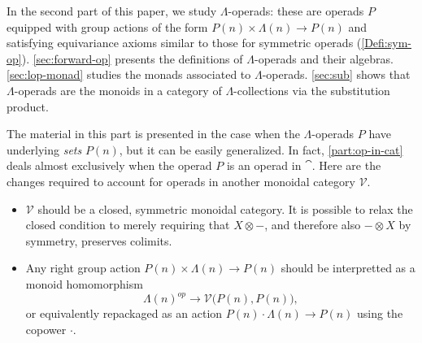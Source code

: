 \label{part:op-with-eq}

In the second part of this paper, we study $\Lambda$-operads: these are operads $P$ equipped with group actions of the form $P(n) \times \Lambda(n) \to P(n)$ and satisfying equivariance axioms similar to those for symmetric operads (\cref{Defi:sym-op}). \cref{sec:forward-op} presents the definitions of $\Lambda$-operads and their algebras.\cref{sec:lop-monad} studies the monads associated to $\Lambda$-operads. \cref{sec:sub} shows that $\Lambda$-operads are the monoids in a category of $\Lambda$-collections via the substitution product.

\begin{rem}\label{rem:lop-Venriched}
The material in this part is presented in the case when the $\Lambda$-operads $P$ have underlying \emph{sets} $P(n)$, but it can be easily generalized. In fact, \cref{part:op-in-cat} deals almost exclusively when the operad $P$ is an operad in $\cat$. Here are the changes required to account for operads in another monoidal category $\mathcal{V}$.
\begin{itemize}
\item $\mathcal{V}$ should be a closed, symmetric monoidal category. It is possible to relax the closed condition to merely requiring that $X \otimes -$, and therefore also $- \otimes X$ by symmetry, preserves colimits.
\item Any right group action $P(n) \times \Lambda(n) \to P(n)$ should be interpretted as a monoid homomorphism
\[
\Lambda(n)^{op} \to \mathcal{V} \big( P(n), P(n) \big),
\]
or equivalently repackaged as an action $P(n) \cdot \Lambda(n) \to P(n)$ using the copower $\cdot$.
\end{itemize}
\end{rem}


